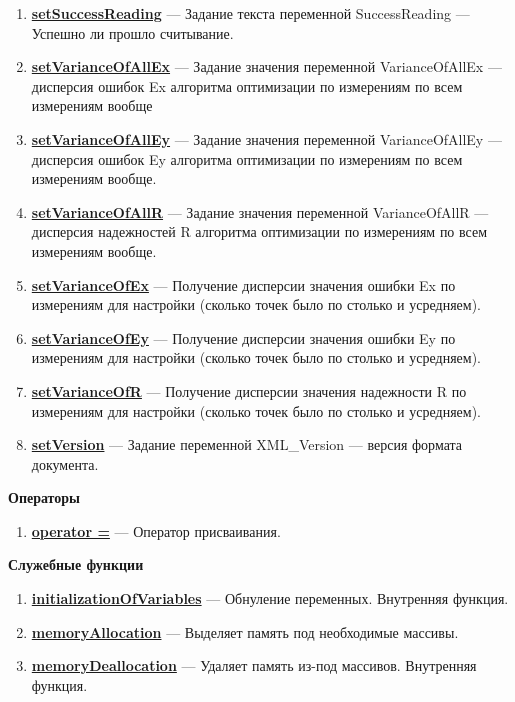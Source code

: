 \documentclass[a4paper,12pt]{article}
\begin{document}
\begin{enumerate}
\item \textbf{\hyperref[setSuccessReading]{setSuccessReading}} --- Задание текста переменной SuccessReading --- Успешно ли прошло считывание.

\item \textbf{\hyperref[setVarianceOfAllEx]{setVarianceOfAllEx}} --- Задание значения переменной VarianceOfAllEx --- дисперсия ошибок Ex алгоритма оптимизации по измерениям по всем измерениям вообще

\item \textbf{\hyperref[setVarianceOfAllEy]{setVarianceOfAllEy}} --- Задание значения переменной VarianceOfAllEy --- дисперсия ошибок Ey алгоритма оптимизации по измерениям по всем измерениям вообще.

\item \textbf{\hyperref[setVarianceOfAllR]{setVarianceOfAllR}} --- Задание значения переменной VarianceOfAllR --- дисперсия надежностей R алгоритма оптимизации по измерениям по всем измерениям вообще.

\item \textbf{\hyperref[setVarianceOfEx]{setVarianceOfEx}} --- Получение дисперсии значения ошибки Ex по измерениям для настройки (сколько точек было по столько и усредняем).

\item \textbf{\hyperref[setVarianceOfEy]{setVarianceOfEy}} --- Получение дисперсии значения ошибки Ey по измерениям для настройки (сколько точек было по столько и усредняем).

\item \textbf{\hyperref[setVarianceOfR]{setVarianceOfR}} --- Получение дисперсии значения надежности R по измерениям для настройки (сколько точек было по столько и усредняем).

\item \textbf{\hyperref[setVersion]{setVersion}} --- Задание переменной XML\_Version --- версия формата документа.

\end{enumerate}

\textbf{Операторы}
\begin{enumerate}

\item \textbf{\hyperref[operator =]{operator =}} --- Оператор присваивания.

\end{enumerate}

\textbf{Служебные функции}
\begin{enumerate}

\item \textbf{\hyperref[initializationOfVariables]{initializationOfVariables}} --- Обнуление переменных. Внутренняя функция.

\item \textbf{\hyperref[memoryAllocation]{memoryAllocation}} --- Выделяет память под необходимые массивы.

\item \textbf{\hyperref[memoryDeallocation]{memoryDeallocation}} --- Удаляет память из-под массивов. Внутренняя функция.

\end{enumerate}
\end{document}
